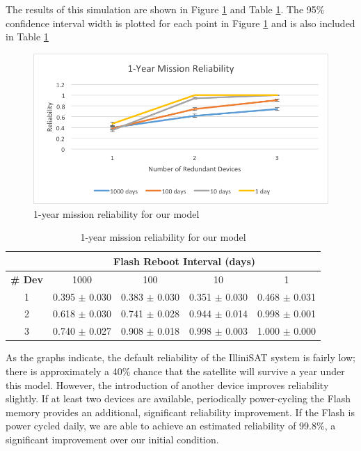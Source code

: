 The results of this simulation are shown in Figure \ref{fig:reliability} and Table \ref{tab:reliability}.  The 95\% confidence interval width is plotted for each point in Figure \ref{fig:reliability} and is also included in Table \ref{tab:reliability}

\begin{figure}[width = 0.5\textwidth]
\centering
\includegraphics[scale=0.6]{reliability}
\caption{1-year mission reliability for our model}\label{fig:reliability}
\end{figure}

\begin{table}[width = 0.5\textwidth]
\centering
\begin{tabular}{|c|c|c|c|c|}
\hline
& \multicolumn{4}{|c|}{\bf Flash Reboot Interval (days)}\\
\hline
{\bf \# Dev} & 1000 & 100 & 10 & 1\\
\hline
1 & 0.395 $\pm$ 0.030 & 0.383 $\pm$ 0.030 & 0.351 $\pm$ 0.030 & 0.468 $\pm$ 0.031 \\
2 & 0.618 $\pm$ 0.030 & 0.741 $\pm$ 0.028 & 0.944 $\pm$ 0.014 & 0.998 $\pm$ 0.001 \\
3 & 0.740 $\pm$ 0.027 & 0.908 $\pm$ 0.018 & 0.998 $\pm$ 0.003 & 1.000 $\pm$ 0.000 \\
\hline
\end{tabular}
\caption{1-year mission reliability for our model}\label{tab:reliability}
\end{table}

As the graphs indicate, the default reliability of the IlliniSAT system is fairly low; there is approximately a 40\% chance that the satellite will survive a year under this model.  However, the introduction of another device improves reliability slightly.  If at least two devices are available, periodically power-cycling the Flash memory provides an additional, significant reliability improvement.  If the Flash is power cycled daily, we are able to achieve an estimated reliability of 99.8\%, a significant improvement over our initial condition.

